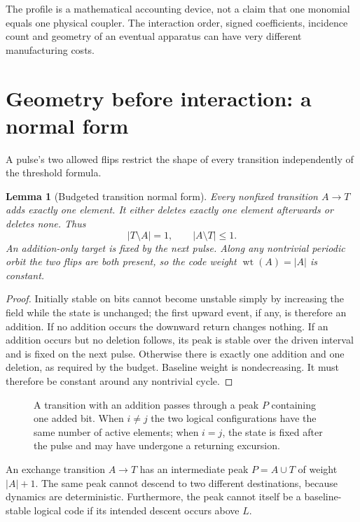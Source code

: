 \documentclass[12pt,letterpaper]{article}
\newtheorem{lemma}[theorem]{Lemma}
\theoremstyle{definition}\newtheorem{definition}[theorem]{Definition}
\theoremstyle{remark}\newtheorem{remark}[theorem]{Remark}
\newcommand{\wt}{\operatorname{wt}}
\begin{document}
The profile is a mathematical accounting device, not a claim that one monomial equals one physical coupler. The interaction order, signed coefficients, incidence count and geometry of an eventual apparatus can have very different manufacturing costs.

\section{Geometry before interaction: a normal form}\label{sec:geometry}
A pulse's two allowed flips restrict the shape of every transition independently of the threshold formula.

\begin{lemma}[Budgeted transition normal form]\label{lem:normal}
Every nonfixed transition $A\to T$ adds exactly one element. It either deletes exactly one element afterwards or deletes none. Thus
\begin{equation}\label{eq:shape}
 |T\setminus A|=1,\qquad |A\setminus T|\le1.
\end{equation}
An addition-only target is fixed by the next pulse. Along any nontrivial periodic orbit the two flips are both present, so the code weight $\wt(A)=|A|$ is constant.
\end{lemma}
\begin{proof}
Initially stable on bits cannot become unstable simply by increasing the field while the state is unchanged; the first upward event, if any, is therefore an addition. If no addition occurs the downward return changes nothing. If an addition occurs but no deletion follows, its peak is stable over the driven interval and is fixed on the next pulse. Otherwise there is exactly one addition and one deletion, as required by the budget. Baseline weight is nondecreasing. It must therefore be constant around any nontrivial cycle.
\end{proof}

\begin{figure}[ht]
\centering\resizebox{\linewidth}{!}{}
\caption{A transition with an addition passes through a peak $P$ containing one added bit. When $i\ne j$ the two logical configurations have the same number of active elements; when $i=j$, the state is fixed after the pulse and may have undergone a returning excursion.}
\label{fig:geometry}
\end{figure}

An exchange transition $A\to T$ has an intermediate peak $P=A\cup T$ of weight $|A|+1$. The same peak cannot descend to two different destinations, because dynamics are deterministic. Furthermore, the peak cannot itself be a baseline-stable logical code if its intended descent occurs above $L$.
\end{document}
